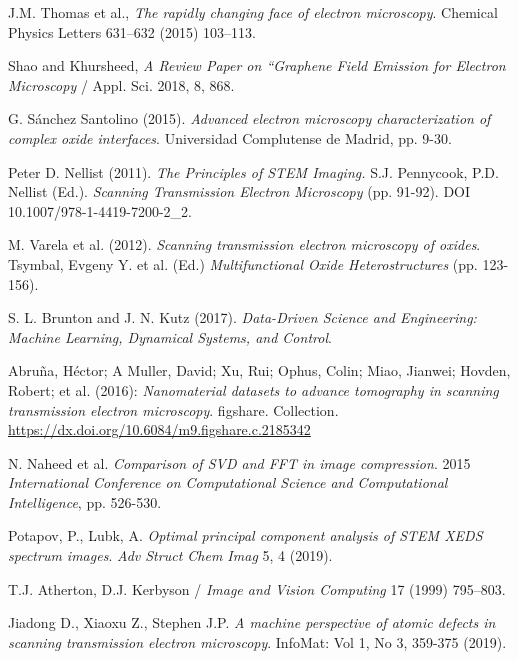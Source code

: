 
 \normalsize



\begin{thebibliography}{9}

J.M. Thomas et al., \textit{The rapidly changing face of electron microscopy}. Chemical Physics Letters 631–632 (2015) 103–113.

Shao and Khursheed, \textit{A Review Paper on “Graphene Field Emission for Electron Microscopy} / Appl. Sci. 2018, 8, 868.

G. Sánchez Santolino (2015). \textit{Advanced electron microscopy characterization of complex oxide interfaces}. Universidad Complutense de Madrid, pp. 9-30.

Peter D. Nellist (2011). \textit{The Principles of STEM Imaging.} S.J. Pennycook, P.D. Nellist (Ed.). \textit{Scanning Transmission Electron Microscopy }(pp. 91-92). DOI 10.1007/978-1-4419-7200-2\_2. 

M. Varela et al. (2012). \textit{Scanning transmission electron microscopy of oxides}. Tsymbal, Evgeny Y. et al. (Ed.) \textit{Multifunctional Oxide Heterostructures} (pp. 123-156).

S. L. Brunton and J. N. Kutz (2017). \textit{Data-Driven Science and Engineering: Machine Learning, Dynamical Systems, and Control}.

Abruña, Héctor; A Muller, David; Xu, Rui; Ophus, Colin; Miao, Jianwei; Hovden, Robert; et al. (2016): \textit{Nanomaterial datasets to advance tomography in scanning transmission electron microscopy}. figshare. Collection. \href{https://dx.doi.org/10.6084/m9.figshare.c.2185342}{https://dx.doi.org/10.6084/m9.figshare.c.2185342}

N. Naheed et al. \textit{Comparison of SVD and FFT in image compression}. 2015 \textit{International Conference on Computational Science and Computational Intelligence}, pp. 526-530.

Potapov, P., Lubk, A. \textit{Optimal principal component analysis of STEM XEDS spectrum images}. \textit{Adv Struct Chem Imag} 5, 4 (2019). 

T.J. Atherton, D.J. Kerbyson / \textit{Image and Vision Computing} 17 (1999) 795–803.

Jiadong D., Xiaoxu Z., Stephen J.P. \textit{A machine perspective of atomic defects in scanning transmission electron microscopy}. InfoMat: Vol 1, No 3, 359-375 (2019).


\end{thebibliography}
